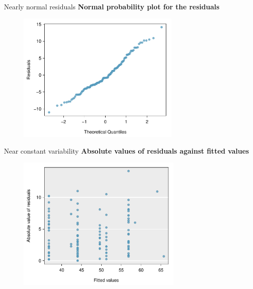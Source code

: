 \documentclass[12pt,a4paper]{beamer}
\begin{document}
			\begin{frame}{Nearly normal residuals}
				\textbf{Normal probability plot for the residuals}
				\begin{figure}
				\centering
	\includegraphics[width=0.71\textwidth]{figures/marioKartDiagnostics/mkDiagnosticNormalQuantilePlot}
				\end{figure}
			\end{frame}
			\begin{frame}{Near constant variability}
				\textbf{Absolute values of residuals against fitted values}
				\begin{figure}
				\centering
				\includegraphics[width=0.72\textwidth]{figures/marioKartDiagnostics/mkDiagnosticEvsAbsF}
			
				\label{mkDiagnosticEvsAbsF}
				\end{figure}
			\end{frame}
\end{document}
